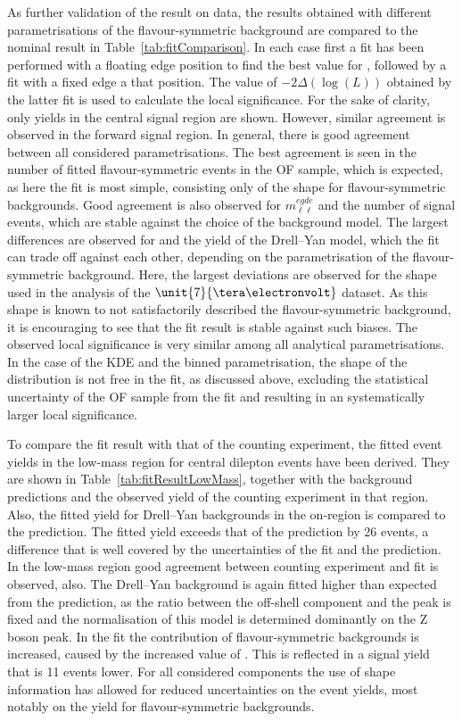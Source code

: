 As further validation of the result on data, the results obtained with different parametrisations of the flavour-symmetric background are compared to the nominal result in Table~\ref{tab:fitComparison}. In each case first a fit has been performed with a floating edge position to find the best value for \mlledge, followed by a fit with a fixed edge a that position. The value of  $-2\Delta\left(\log\left(L\right)\right)$ obtained by the latter fit is used to calculate the local significance. For the sake of clarity, only yields in the central signal region are shown. However, similar agreement is observed in the forward signal region. In general, there is good agreement between all considered parametrisations. The best agreement is seen in the number of fitted flavour-symmetric events in the OF sample, which is expected, as here the fit is most simple, consisting only of the shape for flavour-symmetric backgrounds. Good agreement is also observed for $m_{\ell\ell}^{egde}$ and the number of signal events, which are stable against the choice of the background model. The largest differences are observed for \Rsfof and the yield of the Drell--Yan model, which the fit can trade off against each other, depending on the parametrisation of the flavour-symmetric background. Here, the largest deviations are observed for the shape used in the analysis of the $\unit{7}{\tera\electronvolt}$ dataset. As this shape is known to not satisfactorily described the flavour-symmetric background, it is encouraging to see that the fit result is stable against such biases. The observed local significance is very similar among all analytical parametrisations. In the case of the KDE and the binned parametrisation, the shape of the distribution is not free in the fit, as discussed above, excluding the statistical uncertainty of the OF sample from the fit and resulting in an systematically larger local significance. 



To compare the fit result with that of the counting experiment, the fitted event yields in the low-mass region for central dilepton events have been derived. They are shown in Table~\ref{tab:fitResultLowMass}, together with the background predictions and the observed yield of the counting experiment in that region. Also, the fitted yield for Drell--Yan backgrounds  in the on-\Z region is compared to the prediction. The fitted yield exceeds that of the prediction by 26 events, a difference that is well covered by the uncertainties of the fit and the prediction. In the low-mass region good agreement between counting experiment and fit is observed, also. The Drell--Yan background is again fitted higher than expected from the prediction, as the ratio between the off-shell component and the peak is fixed and the normalisation of this model is determined dominantly on the Z boson peak. In the fit the contribution of flavour-symmetric backgrounds is increased, caused by the increased value of \Rsfof. This is reflected in a signal yield that is 11 events lower. For all considered components the use of shape information has allowed for reduced uncertainties on the event yields, most notably on the yield for flavour-symmetric backgrounds. 


